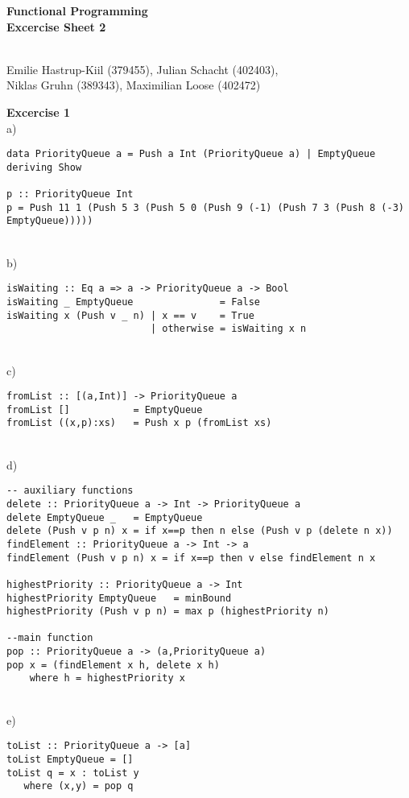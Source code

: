 \documentclass[a4paper,12pt,oneside]{book}
\begin{document}
\setlength{\parindent}{0em} 


\begin{center} 
\textbf{\huge{Functional Programming} \\ \large{ Excercise Sheet 2}} %

~\\
Emilie Hastrup-Kiil (379455), 
Julian Schacht (402403), \\
Niklas Gruhn (389343), 
Maximilian Loose (402472)
\end{center}
\textbf{Excercise 1} \\ %
a)
\begin{lstlisting}
data PriorityQueue a = Push a Int (PriorityQueue a) | EmptyQueue deriving Show

p :: PriorityQueue Int
p = Push 11 1 (Push 5 3 (Push 5 0 (Push 9 (-1) (Push 7 3 (Push 8 (-3) EmptyQueue)))))
\end{lstlisting}
~\\
b)
\begin{lstlisting}
isWaiting :: Eq a => a -> PriorityQueue a -> Bool
isWaiting _ EmptyQueue               = False
isWaiting x (Push v _ n) | x == v    = True
                         | otherwise = isWaiting x n
\end{lstlisting}
~\\           
c)
\begin{lstlisting}
fromList :: [(a,Int)] -> PriorityQueue a
fromList []           = EmptyQueue
fromList ((x,p):xs)   = Push x p (fromList xs)
\end{lstlisting}
~\\
d)
\begin{lstlisting}
-- auxiliary functions
delete :: PriorityQueue a -> Int -> PriorityQueue a
delete EmptyQueue _   = EmptyQueue
delete (Push v p n) x = if x==p then n else (Push v p (delete n x)) 
findElement :: PriorityQueue a -> Int -> a
findElement (Push v p n) x = if x==p then v else findElement n x

highestPriority :: PriorityQueue a -> Int
highestPriority EmptyQueue   = minBound
highestPriority (Push v p n) = max p (highestPriority n)

--main function
pop :: PriorityQueue a -> (a,PriorityQueue a)
pop x = (findElement x h, delete x h)
    where h = highestPriority x
\end{lstlisting}
~\\
e)
\begin{lstlisting}
toList :: PriorityQueue a -> [a]
toList EmptyQueue = []
toList q = x : toList y
   where (x,y) = pop q
\end{lstlisting}
\end{document}
